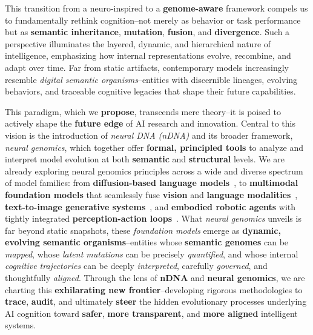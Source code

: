 \vspace{1mm}
This transition from a neuro-inspired to a \textbf{genome-aware} framework compels us to fundamentally rethink cognition--not merely as behavior or task performance but as \textbf{semantic inheritance}, \textbf{mutation}, \textbf{fusion}, and \textbf{divergence}. Such a perspective illuminates the layered, dynamic, and hierarchical nature of intelligence, emphasizing how internal representations evolve, recombine, and adapt over time. Far from static artifacts, contemporary models increasingly resemble \emph{digital semantic organisms}--entities with discernible lineages, evolving behaviors, and traceable cognitive legacies that shape their future capabilities.

\vspace{1mm}
This paradigm, which we \textbf{propose}, transcends mere theory--it is poised to actively shape the \textbf{future edge} of AI research and innovation. Central to this vision is the introduction of \emph{neural DNA (nDNA)} and its broader framework, \emph{neural genomics}, which together offer \textbf{formal, principled tools} to analyze and interpret model evolution at both \textbf{semantic} and \textbf{structural} levels. We are already exploring neural genomics principles across a wide and diverse spectrum of model families: from \textbf{diffusion-based language models}~\citep{wang2023diffusionlm, li2022diffusiondb}, to \textbf{multimodal foundation models} that seamlessly fuse \textbf{vision} and \textbf{language modalities}~\citep{alayrac2022flamingo, li2023blip2}, \textbf{text-to-image generative systems}~\citep{rombach2022stablediffusion}, and \textbf{embodied robotic agents} with tightly integrated \textbf{perception-action loops}~\citep{ahn2022can, brohan2022saycan}. What \emph{neural genomics} unveils is far beyond static snapshots, these \emph{foundation models} emerge as \textbf{dynamic, evolving semantic organisms}--entities whose \textbf{semantic genomes} can be \emph{mapped}, whose \emph{latent mutations} can be precisely \emph{quantified}, and whose internal \emph{cognitive trajectories} can be deeply \emph{interpreted}, carefully \emph{governed}, and thoughtfully \emph{aligned}. Through the lens of \textbf{nDNA} and \textbf{neural genomics}, we are charting this \textbf{exhilarating new frontier}--developing rigorous methodologies to \textbf{trace}, \textbf{audit}, and ultimately \textbf{steer} the hidden evolutionary processes underlying AI cognition toward \textbf{safer}, \textbf{more transparent}, and \textbf{more aligned} intelligent systems.



